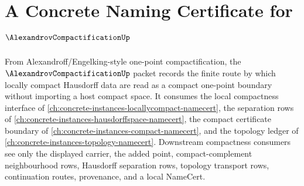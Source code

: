 \chapter{A Concrete Naming Certificate for $\AlexandrovCompactificationUp$}
\label{ch:concrete-instances-alexandrov-compactification-namecert}

From Alexandroff/Engelking-style one-point compactification, the $\AlexandrovCompactificationUp$ packet records the finite route by which locally compact Hausdorff data are read as a compact one-point boundary without importing a host compact space. It consumes the local compactness interface of \autoref{ch:concrete-instances-locallycompact-namecert}, the separation rows of \autoref{ch:concrete-instances-hausdorffspace-namecert}, the compact certificate boundary of \autoref{ch:concrete-instances-compact-namecert}, and the topology ledger of \autoref{ch:concrete-instances-topology-namecert}. Downstream compactness consumers see only the displayed carrier, the added point, compact-complement neighbourhood rows, Hausdorff separation rows, topology transport rows, continuation routes, provenance, and a local NameCert.

